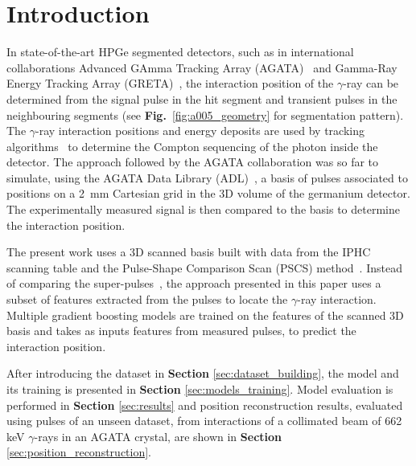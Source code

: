 \section{Introduction}
\label{sec:intro}
In state-of-the-art HPGe segmented detectors, such as in international collaborations Advanced GAmma Tracking Array (AGATA)~\cite{Akkoyun2012} and Gamma-Ray Energy Tracking Array (GRETA)~\cite{Lee2003DevelopmentsArrays}, the interaction position of the $\gamma$-ray can be determined from the signal pulse in the hit segment and transient pulses in the neighbouring segments (see \textbf{Fig.}~\ref{fig:a005_geometry} for segmentation pattern). The $\gamma$-ray interaction positions and energy deposits are used by tracking algorithms~\cite{Bazzacco:2004nnw,Lopez-Martens2004}  to determine the Compton sequencing of the photon inside the detector. The approach followed by the AGATA collaboration was so far to simulate, using the AGATA Data Library (ADL)~\cite{Bruyneel2006,Bruyneel2006-2,BruyneelUnpub}, a basis of pulses associated to positions on a 2~mm Cartesian grid in the 3D volume of the germanium detector. The experimentally measured signal is then compared to the basis to determine the interaction position.

The present work uses a 3D scanned basis built with data from the IPHC scanning table and the Pulse-Shape Comparison Scan (PSCS) method~\cite{Crespi2008}. Instead of comparing the super-pulses~\cite{}, the approach presented in this paper uses a subset of features extracted from the pulses to locate the $\gamma$-ray interaction. Multiple gradient boosting models are trained on the features of the scanned 3D basis and takes as inputs features from measured pulses, to predict the interaction position.

After introducing the dataset in \textbf{Section} \ref{sec:dataset_building}, the model and its training is presented in \textbf{Section }\ref{sec:models_training}. Model evaluation is performed in \textbf{Section} \ref{sec:results} and position reconstruction results, evaluated using pulses of an unseen dataset, from interactions of a collimated beam of 662 keV $\gamma$-rays in an AGATA crystal, are shown in \textbf{Section} \ref{sec:position_reconstruction}.


